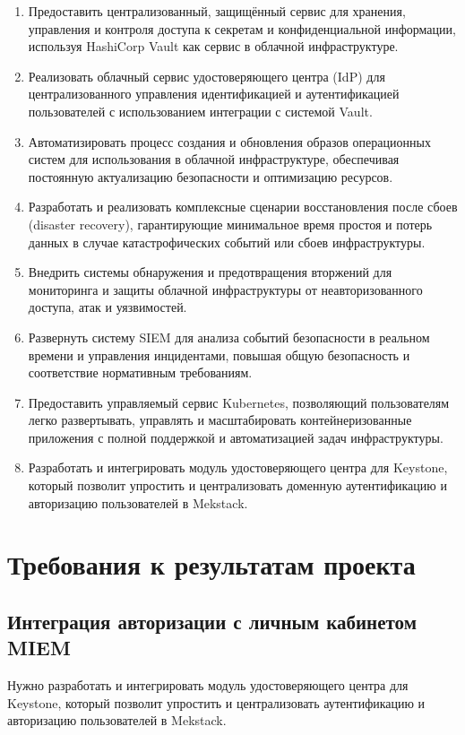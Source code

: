 \documentclass[14pt, a4paper]{extarticle}
\begin{document}
\begin{enumerate}
\item Предоставить централизованный, защищённый сервис для хранения, управления и контроля доступа к секретам и конфиденциальной информации, используя HashiCorp Vault как сервис в облачной инфраструктуре.
\item Реализовать облачный сервис удостоверяющего центра (IdP) для централизованного управления идентификацией и аутентификацией пользователей с использованием интеграции с системой Vault.
\item Автоматизировать процесс создания и обновления образов операционных систем для использования в облачной инфраструктуре, обеспечивая постоянную актуализацию безопасности и оптимизацию ресурсов.
\item Разработать и реализовать комплексные сценарии восстановления после сбоев (disaster recovery), гарантирующие минимальное время простоя и потерь данных в случае катастрофических событий или сбоев инфраструктуры.
\item Внедрить системы обнаружения и предотвращения вторжений для мониторинга и защиты облачной инфраструктуры от неавторизованного доступа, атак и уязвимостей.
\item Развернуть систему SIEM для анализа событий безопасности в реальном времени и управления инцидентами, повышая общую безопасность и соответствие нормативным требованиям.
\item Предоставить управляемый сервис Kubernetes, позволяющий пользователям легко развертывать, управлять и масштабировать контейнеризованные приложения с полной поддержкой и автоматизацией задач инфраструктуры.
\item Разработать и интегрировать модуль удостоверяющего центра для Keystone, который позволит упростить и централизовать доменную аутентификацию и авторизацию пользователей в Mekstack.
\end{enumerate}

\section{Требования к результатам проекта}

\subsection{Интеграция авторизации с личным кабинетом MIEM}

Нужно разработать и интегрировать модуль удостоверяющего центра для Keystone, который позволит упростить и централизовать аутентификацию и авторизацию пользователей в Mekstack.
\end{document}
